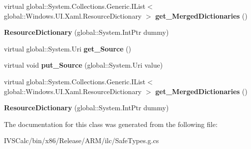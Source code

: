 \begin{DoxyCompactItemize}
virtual global\+::\+System.\+Collections.\+Generic.\+I\+List$<$ global\+::\+Windows.\+U\+I.\+Xaml.\+Resource\+Dictionary $>$ {\bfseries get\+\_\+\+Merged\+Dictionaries} ()
\item 
\mbox{\label{class_windows_1_1_u_i_1_1_xaml_1_1_resource_dictionary_a0cbfb902f5ff2e6c1f1eb1afb0bca04c}} 
{\bfseries Resource\+Dictionary} (global\+::\+System.\+Int\+Ptr dummy)
\item 
\mbox{\label{class_windows_1_1_u_i_1_1_xaml_1_1_resource_dictionary_a8377dec4bb445706e6660da622358e2f}} 
virtual global\+::\+System.\+Uri {\bfseries get\+\_\+\+Source} ()
\item 
\mbox{\label{class_windows_1_1_u_i_1_1_xaml_1_1_resource_dictionary_aa192ade6e6b72c6129bf8ff27c6be96f}} 
virtual void {\bfseries put\+\_\+\+Source} (global\+::\+System.\+Uri value)
\item 
\mbox{\label{class_windows_1_1_u_i_1_1_xaml_1_1_resource_dictionary_ae4c33952a20ac36d63cbc631d1198e6a}} 
virtual global\+::\+System.\+Collections.\+Generic.\+I\+List$<$ global\+::\+Windows.\+U\+I.\+Xaml.\+Resource\+Dictionary $>$ {\bfseries get\+\_\+\+Merged\+Dictionaries} ()
\item 
\mbox{\label{class_windows_1_1_u_i_1_1_xaml_1_1_resource_dictionary_a0cbfb902f5ff2e6c1f1eb1afb0bca04c}} 
{\bfseries Resource\+Dictionary} (global\+::\+System.\+Int\+Ptr dummy)
\end{DoxyCompactItemize}


The documentation for this class was generated from the following file\+:\begin{DoxyCompactItemize}
\item 
I\+V\+S\+Calc/bin/x86/\+Release/\+A\+R\+M/ilc/Safe\+Types.\+g.\+cs\end{DoxyCompactItemize}
